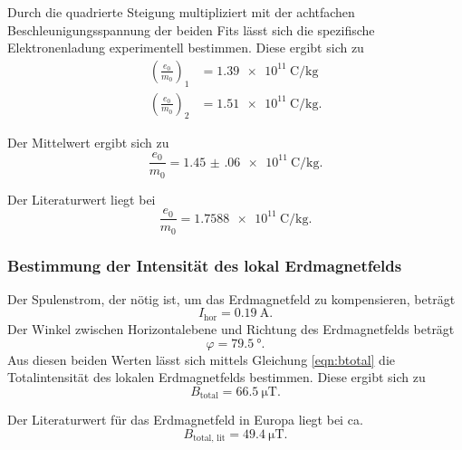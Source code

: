\noindent Durch die quadrierte Steigung multipliziert mit der achtfachen Beschleunigungsspannung der beiden Fits
lässt sich die spezifische Elektronenladung experimentell bestimmen.
Diese ergibt sich zu
\begin{align*}
    \left(\frac{e_0}{m_0}\right)_1 &= \SI{1.39e11}{\coulomb\per\kilogram}\\
    \left(\frac{e_0}{m_0}\right)_2 &= \SI{1.51e11}{\coulomb\per\kilogram}.
\end{align*}

\noindent Der Mittelwert ergibt sich zu 
\begin{equation*}
    \frac{e_0}{m_0} = \SI{1.45(06)e11}{\coulomb\per\kilo\gram}.
\end{equation*}

\noindent Der Literaturwert liegt bei 
\begin{equation*}
    \frac{e_0}{m_0} = \SI{1.7588e11}{\coulomb\per\kilo\gram}.
\end{equation*}

\subsubsection{Bestimmung der Intensität des lokal Erdmagnetfelds}
Der Spulenstrom, der nötig ist, um das Erdmagnetfeld zu
kompensieren, beträgt
\begin{equation*}
    I_\text{hor} = \SI{0.19}{\ampere}.
\end{equation*}
Der Winkel zwischen Horizontalebene und Richtung des Erdmagnetfelds
beträgt
\begin{equation*}
    \varphi = \SI{79.5}{\degree}.
\end{equation*}
Aus diesen beiden Werten lässt sich mittels Gleichung \eqref{eqn:btotal}
die Totalintensität des lokalen Erdmagnetfelds bestimmen.
Diese ergibt sich zu
\begin{equation*}
    B_\text{total} = \SI{66.5}{\micro\tesla}.
\end{equation*}

\noindent Der Literaturwert für das Erdmagnetfeld in Europa \cite{btotal} liegt bei ca.
\begin{equation*}
    B_\text{total, lit} = \SI{49.4}{\micro\tesla}.
\end{equation*} %
